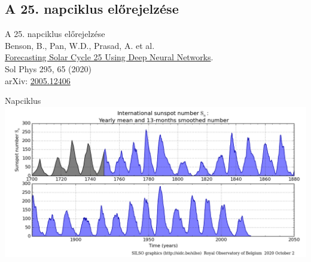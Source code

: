 \subsection{A 25. napciklus előrejelzése}

\begin{frame}{}
    \centering
    \Huge{A 25. napciklus előrejelzése}\\
    \vspace*{1cm}
    \large{Benson, B., Pan, W.D., Prasad, A. et al. \\ \href{https://doi.org/10.1007/s11207-020-01634-y}{Forecasting Solar Cycle 25 Using Deep Neural Networks}. \\ Sol Phys 295, 65 (2020)} \\ 
    \vspace*{0.2cm}
    \large{arXiv: \href{https://arxiv.org/abs/2005.12406}{2005.12406}}
\end{frame}

\begin{frame}{Napciklus}
    \centering
    \includegraphics[width=1.0\textwidth]{figures/sunspot_number.png}
\end{frame}


